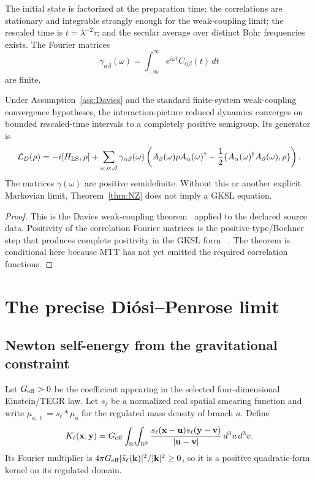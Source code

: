 \documentclass[11pt]{article}
\newcommand{\cL}{\mathcal L}
\begin{document}
\begin{assumption}\label{ass:Davies}
The initial state is factorized at the preparation time; the correlations are
stationary and integrable strongly enough for the weak-coupling limit; the rescaled
time is $t=\lambda^{-2}\tau$; and the secular average over distinct Bohr frequencies
exists. The Fourier matrices
\[
 \gamma_{\alpha\beta}(\omega)=
\int_{-\infty}^{\infty}e^{i\omega t}C_{\alpha\beta}(t)\,dt
\]
are finite.
\end{assumption}

\begin{theorem}\label{thm:Davies}
Under Assumption~\ref{ass:Davies} and the standard finite-system weak-coupling
convergence hypotheses, the interaction-picture reduced dynamics converges on
bounded rescaled-time intervals to a completely positive semigroup. Its generator is
\[
 \cL_D(\rho)=-i[H_{\rm LS},\rho]
+\sum_{\omega,\alpha,\beta}\gamma_{\alpha\beta}(\omega)
\left(
A_\beta(\omega)\rho A_\alpha(\omega)^\dagger
-\frac12\{A_\alpha(\omega)^\dagger A_\beta(\omega),\rho\}
\right).
\]
The matrices $\gamma(\omega)$ are positive semidefinite. Without this or another
explicit Markovian limit, Theorem~\ref{thm:NZ} does not imply a GKSL equation.
\end{theorem}

\begin{proof}
This is the Davies weak-coupling theorem~\cite{Davies1974} applied to the declared source data.
Positivity of the correlation Fourier matrices is the positive-type/Bochner step
that produces complete positivity in the GKSL form
~\cite{GKSL1976,Lindblad1976}. The theorem is conditional here because MTT has
not yet emitted the required correlation functions.
\end{proof}

\section{The precise Di\'osi--Penrose limit}

\subsection{Newton self-energy from the gravitational constraint}

Let $G_{\rm eff}>0$ be the coefficient appearing in the selected four-dimensional
Einstein/TEGR law. Let $s_\ell$ be a normalized real spatial smearing function and
write $\mu_{a,\ell}=s_\ell*\mu_a$ for the regulated mass density of branch $a$.
Define
\[
 K_\ell(\mathbf x,\mathbf y)=
 G_{\rm eff}\int_{\mathbb R^3}\!\!\int_{\mathbb R^3}
 \frac{s_\ell(\mathbf x-\mathbf u)s_\ell(\mathbf y-\mathbf v)}
 {|\mathbf u-\mathbf v|}\,d^3u\,d^3v.
\]
Its Fourier multiplier is
$4\pi G_{\rm eff}|\widehat s_\ell(\mathbf k)|^2/|\mathbf k|^2\geq0$, so it is a positive
quadratic-form kernel on its regulated domain.
\end{document}
